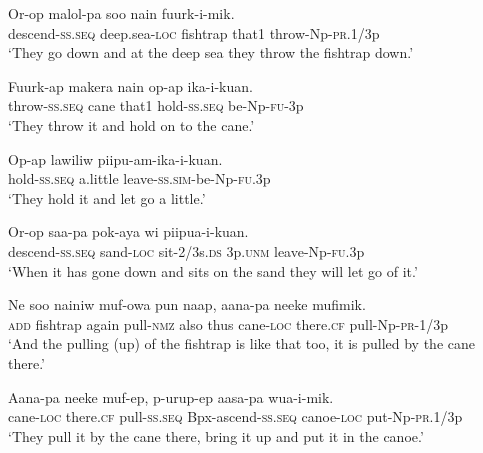 {\ea\label{ex:a:x17}
\gll  Or-op  malol-pa  soo  nain  fuurk-i-mik. \\
descend-\textsc{ss.seq}  deep.sea-\textsc{loc}  fishtrap  that1  throw{}-Np-\textsc{pr}.1/3p \\
\glt ‘They go down and at the deep sea they throw the fishtrap down.’ \\
\z


\ea\label{ex:a:x18}
\gll  Fuurk-ap  makera  nain  op-ap  ika-i-kuan. \\
throw-\textsc{ss.seq}  cane  that1  hold-\textsc{ss.seq}  be-Np-\textsc{fu}-3p \\
\glt ‘They throw it and hold on to the cane.’ \\
\z


\ea\label{ex:a:x19}
\gll  Op-ap  lawiliw  piipu-am-ika-i-kuan. \\
hold-\textsc{ss.seq}  a.little  leave-\textsc{ss}.\textsc{sim}-be-Np-\textsc{fu}.3p \\
\glt ‘They hold it and let go a little.’ \\
\z


\ea\label{ex:a:x20}
\gll  Or-op  saa-pa  pok-aya  wi  piipua-i-kuan. \\
descend-\textsc{ss.seq}  sand-\textsc{loc}  sit-2/3s.\textsc{ds}  3p.\textsc{unm}  leave-Np-\textsc{fu}.3p \\
\glt ‘When it has gone down and sits on the sand they will let go of it.’ \\
\z


\ea\label{ex:a:x21}
\gll  Ne  soo  nainiw  muf-owa  pun  naap,  aana-pa  neeke  mufimik. \\
\textsc{add}  fishtrap  again  pull-\textsc{nmz}  also  thus  cane-\textsc{loc}  there.\textsc{cf}  pull-Np-\textsc{pr}-1/3p \\


\glt ‘And the pulling (up) of the fishtrap is like that too, it is pulled by the cane there.’ \\
\z


\ea\label{ex:a:x22}
\gll  Aana-pa  neeke  muf-ep,  p-urup-ep               aasa-pa  wua-i-mik. \\
cane-\textsc{loc}  there.\textsc{cf}  pull-\textsc{ss.seq}  Bpx-ascend-\textsc{ss.seq}     canoe-\textsc{loc}  put-Np-\textsc{pr}.1/3p \\


\glt ‘They pull it by the cane there, bring it up and put it in the canoe.’ \\
\z


}
